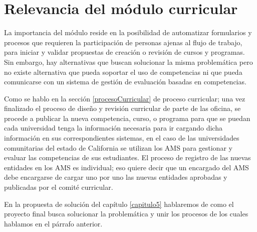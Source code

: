 \section{Relevancia del módulo curricular}
La importancia del módulo reside en la posibilidad de automatizar formularios y procesos que requieren la participación de personas ajenas al flujo de trabajo, para iniciar y validar propuestas de creación o revisión de cursos y programas. Sin embargo, hay alternativas que buscan solucionar la misma problemática pero no existe alternativa que pueda soportar el uso de competencias ni que pueda comunicarse con un sistema de gestión de evaluación basadas en competencias.

Como se hablo en la sección \ref{procesoCurricular} de proceso curricular; una vez finalizado el proceso de diseño y revisión curricular de parte de las oficina, se procede a publicar la nueva competencia, curso, o programa para que se puedan cada universidad tenga la información necesaria para ir cargando dicha información en sus correspondientes sistemas, en el caso de las universidades comunitarias del estado de California se utilizan los AMS para gestionar y evaluar las competencias de sus estudiantes. El proceso de registro de las nuevas entidades en los AMS es individual; eso quiere decir que un encargado del AMS debe encargarse de cargar uno por uno las nuevas entidades aprobadas y publicadas por el comité curricular.

En la propuesta de solución del capítulo \ref{capitulo5} hablaremos de como el proyecto final busca solucionar la problemática y unir los procesos de los cuales hablamos en el párrafo anterior.